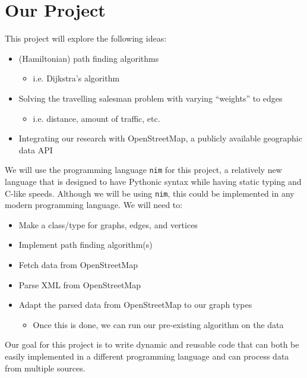 \documentclass{article}
\begin{document}
  \section{Our Project}
    This project will explore the following ideas:
    \begin{itemize}
      \item (Hamiltonian) path finding algorithms
        \begin{itemize}
          \item i.e. Dijkstra's algorithm 
        \end{itemize}
      \item Solving the travelling salesman problem with varying ``weights'' to edges
        \begin{itemize}
          \item i.e. distance, amount of traffic, etc.
        \end{itemize}
      \item Integrating our research with OpenStreetMap, a publicly available geographic data API
    \end{itemize}
    We will use the programming language \texttt{nim} for this project, a relatively new language that is designed to have Pythonic syntax while having static typing and C-like speeds. Although we will be using \texttt{nim}, this could be implemented in any modern programming language. We will need to:
    \begin{itemize}
      \item Make a class/type for graphs, edges, and vertices
      \item Implement path finding algorithm(s)
      \item Fetch data from OpenStreetMap
      \item Parse XML from OpenStreetMap
      \item Adapt the parsed data from OpenStreetMap to our graph types
        \begin{itemize}
          \item Once this is done, we can run our pre-existing algorithm on the data
        \end{itemize} 
    \end{itemize}
    Our goal for this project is to write dynamic and reusable code that can both be easily implemented in a different programming language and can process data from multiple sources.
    
\end{document}
